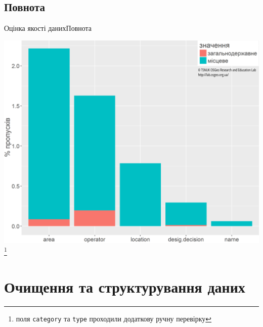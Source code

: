 \documentclass[12pt, aspectratio=1610]{beamer}
\newcommand\blfootnote[1]{%
	\begingroup
	\renewcommand\thefootnote{}\footnote{#1}%
	\addtocounter{footnote}{-1}%
	\endgroup
}
\begin{document}
\subsection{Повнота}
\begin{frame}{Оцінка якості даних}{Повнота}
	\begin{center}
	\includegraphics[height=0.72\textheight]{./figures/simple_completeness_graph.png}
	\blfootnote{\tiny{поля \texttt{category} та \texttt{type} проходили додаткову ручну перевірку}}
	\end{center}
\end{frame}

\section{Очищення та структурування даних}
\end{document}
